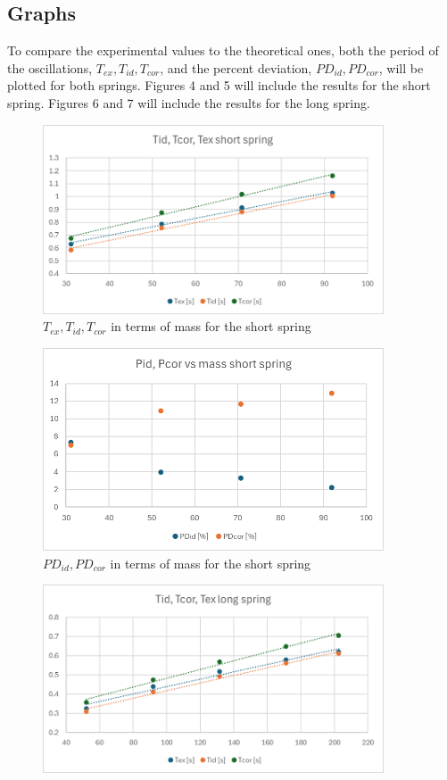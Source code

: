 \documentclass[a4paper, 10pt]{article}
\begin{document}
\begin{justify}
\subsection{Graphs}
To compare the experimental values to the theoretical ones, both the period of
the oscillations, $T_{ex}, T_{id}, T_{cor}$, and the percent deviation,
$PD_{id}, PD_{cor}$, will be plotted for both springs. Figures 4 and 5 will
include the results for the short spring. Figures 6 and 7 will include the
results for the long spring.
\begin{figure}[!h]
    \centering
    \includegraphics[width = 0.9\textwidth]{Shortspring_period.png}
    \caption{$T_{ex}, T_{id}, T_{cor}$ in terms of mass for the short spring}
\end{figure}
\begin{figure}[!h]
    \centering
    \includegraphics[width = 0.9\textwidth]{Shortspring_deviation.png}
    \caption{$PD_{id}, PD_{cor}$ in terms of mass for the short spring}
\end{figure}
\begin{figure}[!h]
    \centering
    \includegraphics[width = 0.9\textwidth]{Longspring_period.png}

\end{figure}
\end{justify}
\end{document}
